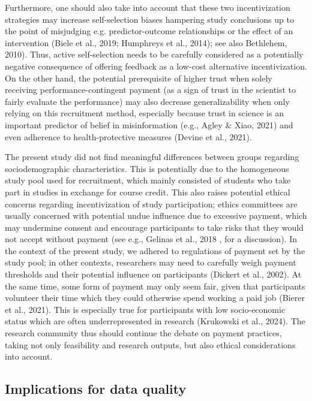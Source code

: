 \documentclass[authordate, empirical]{jote-new-article}
\begin{document}
	Furthermore, one should also take into account that these two incentivization strategies may increase self-selection biases hampering study conclusions up to the point of misjudging e.g. predictor-outcome relationships or the effect of an intervention (Biele et al., 2019; Humphreys et al., 2014); see also Bethlehem, 2010). Thus, active self-selection needs to be carefully considered as a potentially negative consequence of offering feedback as a low-cost alternative incentivization. On the other hand, the potential prerequisite of higher trust when solely receiving performance-contingent payment (as a sign of trust in the scientist to fairly evaluate the performance) may also decrease generalizability when only relying on this recruitment method, especially because trust in science is an important predictor of belief in misinformation (e.g., Agley \& Xiao, 2021) and even adherence to health-protective measures (Devine et al., 2021).



	The present study did not find meaningful differences between groups regarding sociodemographic characteristics. This is potentially due to the homogeneous study pool used for recruitment, which mainly consisted of students who take part in studies in exchange for course credit. This also raises potential ethical concerns regarding incentivization of study participation; ethics committees are usually concerned with potential undue influence due to excessive payment, which may undermine consent and encourage participants to take risks that they would not accept without payment (see e.g., Gelinas et al., 2018 , for a discussion). In the context of the present study, we adhered to regulations of payment set by the study pool; in other contexts, researchers may need to carefully weigh payment thresholds and their potential influence on participants (Dickert et al., 2002). At the same time, some form of payment may only seem fair, given that participants volunteer their time which they could otherwise spend working a paid job (Bierer et al., 2021). This is especially true for participants with low socio-economic status which are often underrepresented in research (Krukowski et al., 2024). The research community thus should continue the debate on payment practices, taking not only feasibility and research outputs, but also ethical considerations into account.



	\subsection{Implications for data quality}
\end{document}
